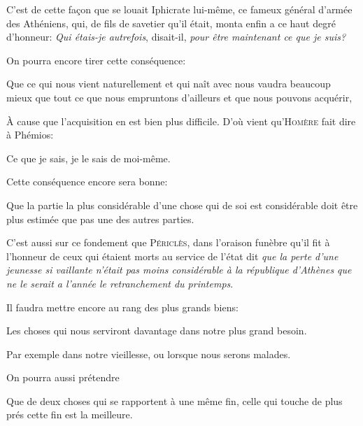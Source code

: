 C'est de cette façon que se louait Iphicrate lui-même, ce fameux général d'armée des Athéniens, qui, de fils de savetier
qu'il était, monta enfin a ce haut degré d'honneur: \emph{Qui étais-je autrefois}, disait-il, \emph{pour être maintenant
ce que je suis?}

\bigbreak

On pourra encore tirer cette conséquence:

\begin{lieu}
  Que ce qui nous vient naturellement et qui naît avec nous vaudra beaucoup mieux que tout ce que nous empruntons d'ailleurs
  et que nous pouvons acquérir, 
\end{lieu}

À cause que l'acquisition en est bien plus difficile. D'où vient qu'\textsc{Homère} fait dire à Phémios:

\begin{emphpar}
  Ce que je sais, je le sais de moi-même.
\end{emphpar}

\bigbreak

Cette conséquence encore sera bonne:

\begin{lieu}
  Que la partie la plus considérable d'une chose qui de soi est considérable doit être plus estimée que pas une des autres
  parties.
\end{lieu}

C'est aussi sur ce fondement que \textsc{Périclès}, dans l'oraison funèbre qu'il fit à l'honneur de ceux qui étaient morts
au service de l’état dit \emph{que la perte d'une jeunesse si vaillante n'était pas moins considérable à la république
d'Athènes que ne le serait a l'année le retranchement du printemps}.

\bigbreak

Il faudra mettre encore au rang des plus grands biens:

\begin{lieu}
  Les choses qui nous serviront davantage dans notre plus grand besoin.
\end{lieu}

Par exemple dans notre vieillesse, ou lorsque nous serons malades.

\bigbreak

On pourra aussi prétendre 

\begin{lieu}
  Que de deux choses qui se rapportent à une même fin, celle qui touche de plus prés cette fin est la meilleure.
\end{lieu}

